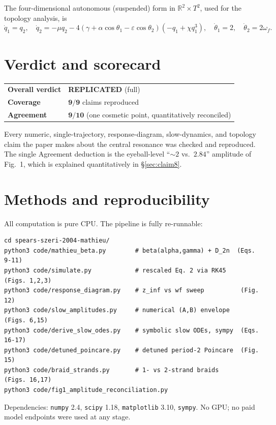 \documentclass[11pt]{article}
\newcommand{\repl}{\textcolor{repgreen}{\textbf{REPLICATED}}}
\newcommand{\wf}{\omega_f}
\begin{document}
The four-dimensional autonomous (suspended) form in $\mathbb{R}^2\times T^2$, used for the
topology analysis, is
\begin{equation}
\dot q_1 = q_2,\quad
\dot q_2 = -\mu q_2 - 4(\gamma+\alpha\cos\theta_1 - \varepsilon\cos\theta_2)(-q_1+\chi q_1^3),\quad
\dot\theta_1 = 2,\quad \dot\theta_2 = 2\wf .
\label{eq:suspended}
\end{equation}

\section{Verdict and scorecard}

\begin{center}
\renewcommand{\arraystretch}{1.25}
\begin{tabular}{@{}lll@{}}
\toprule
\textbf{Overall verdict} & \multicolumn{2}{l}{\repl{} (full)}\\
\textbf{Coverage} & \multicolumn{2}{l}{$\mathbf{9/9}$ claims reproduced}\\
\textbf{Agreement} & \multicolumn{2}{l}{$\mathbf{9/10}$ (one cosmetic point, quantitatively reconciled)}\\
\bottomrule
\end{tabular}
\end{center}

\noindent
Every numeric, single-trajectory, response-diagram, slow-dynamics, and topology claim the
paper makes about the central resonance was checked and reproduced. The single Agreement
deduction is the eyeball-level ``$\sim\!2$ vs.\ $2.84$'' amplitude of Fig.~1, which is
explained quantitatively in \S\ref{sec:claim8}.

\section{Methods and reproducibility}

All computation is pure CPU. The pipeline is fully re-runnable:
\begin{verbatim}
cd spears-szeri-2004-mathieu/
python3 code/mathieu_beta.py        # beta(alpha,gamma) + D_2n  (Eqs. 9-11)
python3 code/simulate.py            # rescaled Eq. 2 via RK45    (Figs. 1,2,3)
python3 code/response_diagram.py    # z_inf vs wf sweep          (Fig. 12)
python3 code/slow_amplitudes.py     # numerical (A,B) envelope   (Figs. 6,15)
python3 code/derive_slow_odes.py    # symbolic slow ODEs, sympy  (Eqs. 16-17)
python3 code/detuned_poincare.py    # detuned period-2 Poincare  (Fig. 15)
python3 code/braid_strands.py       # 1- vs 2-strand braids      (Figs. 16,17)
python3 code/fig1_amplitude_reconciliation.py
\end{verbatim}
Dependencies: \texttt{numpy} 2.4, \texttt{scipy} 1.18, \texttt{matplotlib} 3.10,
\texttt{sympy}. No GPU; no paid model endpoints were used at any stage.
\end{document}
